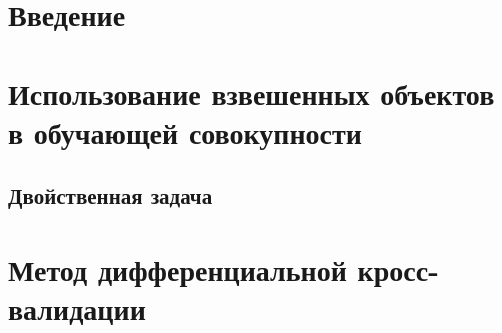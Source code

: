 \documentclass[12pt]{article}
\begin{document}
	
	\newpage \tableofcontents
	\newpage 
	\newpage 

	\section{Введение} 
		
	\section{Использование взвешенных объектов в обучающей совокупности}
		\subsection{Двойственная задача}			
	\section{Метод дифференциальной кросс-валидации}
		
		
		
\end{document}
